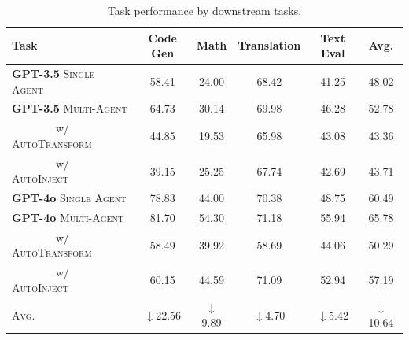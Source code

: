 \documentclass{article}
\theoremstyle{plain}
\theoremstyle{definition}
\theoremstyle{remark}
\begin{document}
\begin{table}[h!]
    \centering
    \caption{Task performance by downstream tasks.}
    \begin{tabular}{lccccc}
        \toprule
        \bf Task & \bf Code Gen & \bf Math & \bf Translation & \bf Text Eval & \sc Avg. \\
        \midrule
        \textbf{GPT-3.5} {\small \textsc{Single Agent}} & 58.41 & 24.00 & 68.42 & 41.25 & 48.02 \\
        \hdashline
        \textbf{GPT-3.5} {\small \textsc{Multi-Agent}} & 64.73 & 30.14 & 69.98 & 46.28 & 52.78 \\
        {\small ~~~~~~~~w/ \textsc{AutoTransform}} & 44.85 & 19.53 & 65.98 & 43.08 & 43.36 \\
        {\small ~~~~~~~~w/ \textsc{AutoInject}} & 39.15 & 25.25 & 67.74 & 42.69 & 43.71 \\
        \midrule
        \textbf{GPT-4o} {\small \textsc{Single Agent}} & 78.83 & 44.00 & 70.38 & 48.75 & 60.49 \\
        \hdashline
        \textbf{GPT-4o} {\small \textsc{Multi-Agent}} & 81.70 & 54.30 & 71.18 & 55.94 & 65.78 \\
        {\small ~~~~~~~~w/ \textsc{AutoTransform}} & 58.49 & 39.92 & 58.69 & 44.06 & 50.29 \\
        {\small ~~~~~~~~w/ \textsc{AutoInject}} & 60.15 & 44.59 & 71.09 & 52.94 & 57.19 \\
        \hline
        {\small \textsc{Avg.}} & $\downarrow$22.56 & $\downarrow$9.89 & $\downarrow$4.70 & $\downarrow$5.42 & $\downarrow$10.64 \\
        \bottomrule
    \end{tabular}
\end{table}
\end{document}
